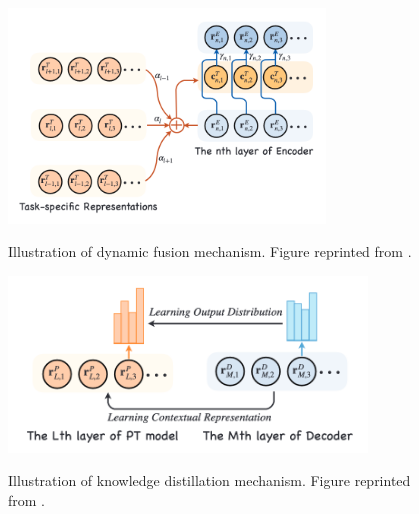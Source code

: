 \begin{figure}[h]
    {\includegraphics[width=0.75\textwidth]{img/dynamic_fusion.png}}
    \centering
    \caption{Illustration of dynamic fusion mechanism. Figure reprinted from .}
    \label{img:dyn_fn}
\end{figure}

\begin{figure}[h]
    {\includegraphics[width=0.85\textwidth]{img/kdweng.png}}
    \centering
    \caption{Illustration of knowledge distillation mechanism. Figure reprinted from .}
    \label{img:kdweng}
\end{figure}

